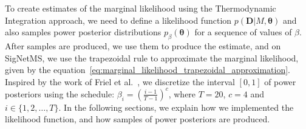 
To create estimates of the marginal likelihood using the Thermodynamic
Integration approach, we need to define a likelihood function $p({\bm
D}| M, {\bm \theta})$ and also samples power posterior distributions
$p_\beta({\bm \theta})$ for a sequence of values of $\beta$. After
samples are produced, we use them to produce the estimate, and on
SigNetMS, we use the trapezoidal rule to approximate the marginal 
likelihood, given by the 
equation~\ref{eq:marginal_likelihood_trapezoidal_approximation}. 
Inspired by the work of Friel et al.~\cite{Friel2008}, we discretize the interval 
$[0, 1]$ of power posteriors using the schedule: 
$\beta_i = \left(\frac{i - 1}{T - 1}\right)^c$, where $T = 20$, $c = 4$
and $i \in \{1, 2, \ldots, T\}$. In the following sections, we explain
how we implemented the likelihood function, and how samples of power
posteriors are produced.

